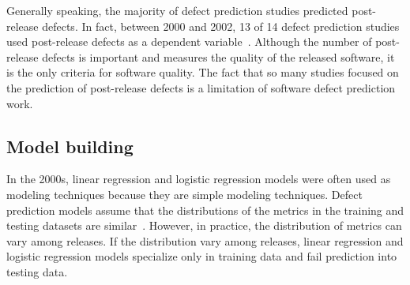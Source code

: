 

Generally speaking, the majority of defect prediction studies predicted post-release defects. In fact, between 2000 and 2002, 13 of 14 defect prediction studies used post-release defects as a dependent variable~\cite{Shihab2012PhD}. Although the number of post-release defects is important and measures the quality of the released software, it is the only criteria for software quality. The fact that so many studies focused on the prediction of post-release defects is a limitation of software defect prediction work.





\subsection{Model building}
In the 2000s, linear regression and logistic regression models were often used as modeling techniques because they are simple modeling techniques. Defect prediction models assume that the distributions of the metrics in the training and testing datasets are similar~\cite{Turhan2009ESE}. However, in practice, the distribution of metrics can vary among releases. 
If the distribution vary among releases, linear regression and logistic regression models
specialize only in training data and fail prediction into testing data.



